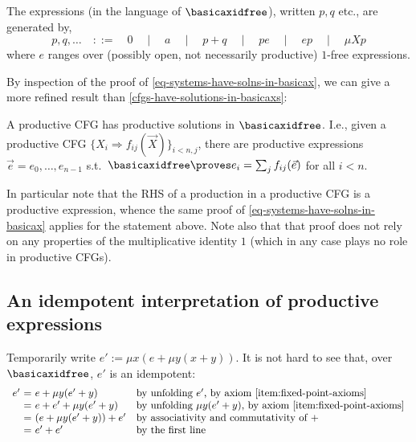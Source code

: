 The  expressions (in the language of $\basicaxidfree$), written $p,q$ etc., are generated by,
\begin{equation}
    \label{eq:productive-expressions}
    p,q,\dots \quad ::= \quad 0 \quad \mid \quad a 
\quad \mid \quad p+q 
\quad \mid \quad pe \quad \mid \quad ep
\quad \mid \quad \mu X p
\end{equation}
where $e$ ranges over (possibly open, not necessarily productive) $1$-free expressions.

By inspection of the proof of \cref{eq-systems-have-solns-in-basicax}, we can give a more refined result than \cref{cfgs-have-solutions-in-basicaxs}:

\begin{proposition}
\label{prod-cfg-has-prod-solns}
    A productive CFG has productive solutions in $\basicaxidfree$.
    I.e., given a productive CFG $\{X_i \Rightarrow f_{ij}(\vec X)\}_{i<n,j}$, there are productive expressions $\vec e = e_0, \dots, e_{n-1}$ s.t.\ $\basicaxidfree \proves e_i = \sum_j f_{ij}(\vec e)$ for all $i<n$.
\end{proposition}
In particular note that the RHS of a production in a productive CFG is a productive expression, whence the same proof of \cref{eq-systems-have-solns-in-basicax} applies for the statement above.
Note also that that proof does not rely on any properties of the multiplicative identity $1$ (which in any case plays no role in productive CFGs).

\subsection{An idempotent interpretation of productive expressions}

Temporarily write $e':= \mu x (e + \mu y (x + y))$. 
It is not hard to see that, over $\basicaxidfree$, $e'$ is an idempotent:
\[
\begin{array}{r@{\ = \ }ll}
      e'  & e + \mu y (e' + y) & \text{by unfolding $e'$, by axiom \eqref{item:fixed-point-axioms}} \\
        & e + e' + \mu y (e' + y) & \text{by unfolding $\mu y (e' + y)$, by axiom \eqref{item:fixed-point-axioms}} \\
        & (e + \mu y (e' + y) ) + e' & \text{by associativity and commutativity of $+$}\\
        & e' + e' & \text{by the first line}
\end{array}
\]

